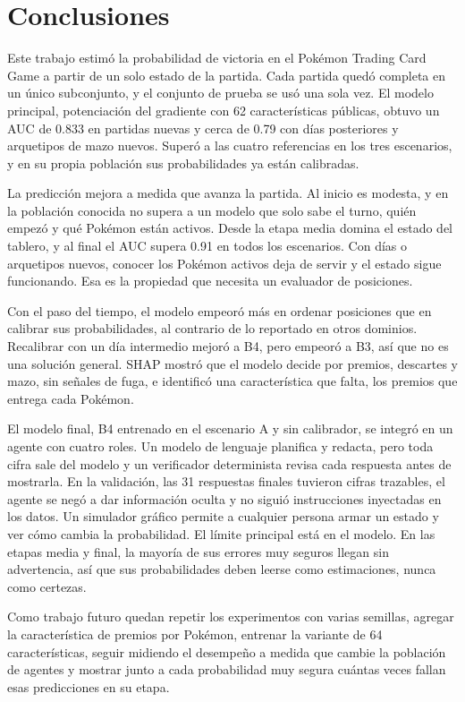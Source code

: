 
\section{Conclusiones}
\label{sec:conclusiones}

Este trabajo estimó la probabilidad de victoria en el Pok\'emon Trading Card
Game a partir de un solo estado de la partida. Cada partida quedó completa
en un único subconjunto, y el conjunto de prueba se usó una sola vez. El
modelo principal, potenciación del gradiente con 62 características
públicas, obtuvo un AUC de 0.833 en partidas nuevas y cerca de 0.79 con
días posteriores y arquetipos de mazo nuevos. Superó a las cuatro
referencias en los tres escenarios, y en su propia población sus
probabilidades ya están calibradas.

La predicción mejora a medida que avanza la partida. Al inicio es modesta,
y en la población conocida no supera a un modelo que solo sabe el turno,
quién empezó y qué Pok\'emon están activos. Desde la etapa media domina el
estado del tablero, y al final el AUC supera 0.91 en todos los escenarios.
Con días o arquetipos nuevos, conocer los Pok\'emon activos deja de servir y
el estado sigue funcionando. Esa es la propiedad que necesita un evaluador
de posiciones.

Con el paso del tiempo, el modelo empeoró más en ordenar posiciones que en
calibrar sus probabilidades, al contrario de lo reportado en otros
dominios. Recalibrar con un día intermedio mejoró a B4, pero empeoró a B3,
así que no es una solución general. SHAP mostró que el modelo decide por
premios, descartes y mazo, sin señales de fuga, e identificó una
característica que falta, los premios que entrega cada Pok\'emon.

El modelo final, B4 entrenado en el escenario A y sin calibrador, se integró
en un agente con cuatro roles. Un modelo de lenguaje planifica y redacta,
pero toda cifra sale del modelo y un verificador determinista revisa cada
respuesta antes de mostrarla. En la validación, las 31 respuestas finales
tuvieron cifras trazables, el agente se negó a dar información oculta y no
siguió instrucciones inyectadas en los datos. Un simulador gráfico permite
a cualquier persona armar un estado y ver cómo cambia la probabilidad. El
límite principal está en el modelo. En las etapas media y final, la mayoría de
sus errores muy seguros llegan sin advertencia, así que sus probabilidades
deben leerse como estimaciones, nunca como certezas.

Como trabajo futuro quedan repetir los experimentos con varias semillas,
agregar la característica de premios por Pok\'emon, entrenar la variante
de 64 características, seguir midiendo el desempeño a medida que cambie la
población de agentes y mostrar junto a cada probabilidad muy segura cuántas
veces fallan esas predicciones en su etapa.